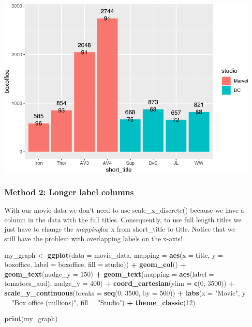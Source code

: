 \documentclass[
]{krantz}
\makeatletter
\newenvironment{Shaded}{\begin{snugshade}}{\end{snugshade}}
\newcommand{\DataTypeTok}[1]{\textcolor[rgb]{0.27,0.27,0.27}{#1}}
\newcommand{\DecValTok}[1]{\textcolor[rgb]{0.06,0.06,0.06}{#1}}
\newcommand{\KeywordTok}[1]{\textcolor[rgb]{0.27,0.27,0.27}{\textbf{#1}}}
\newcommand{\NormalTok}[1]{#1}
\newcommand{\OperatorTok}[1]{\textcolor[rgb]{0.43,0.43,0.43}{\textbf{#1}}}
\newcommand{\StringTok}[1]{\textcolor[rgb]{0.5,0.5,0.5}{#1}}
\newenvironment{kframe}{%
\medskip{}
\setlength{\fboxsep}{.8em}
 \def\at@end@of@kframe{}%
 \ifinner\ifhmode%
  \def\at@end@of@kframe{\end{minipage}}%
  \begin{minipage}{\columnwidth}%
 \fi\fi%
 \def\FrameCommand##1{\hskip\@totalleftmargin \hskip-\fboxsep
 \colorbox{shadecolor}{##1}\hskip-\fboxsep
     \hskip-\linewidth \hskip-\@totalleftmargin \hskip\columnwidth}%
 \MakeFramed {\advance\hsize-\width
   \@totalleftmargin\z@ \linewidth\hsize
   \@setminipage}}%
 {\par\unskip\endMakeFramed%
 \at@end@of@kframe}
\renewenvironment{Shaded}{\begin{kframe}}{\end{kframe}}
\makeatother
\begin{document}
\includegraphics[width=0.65\linewidth]{bookdown_files/figure-latex/unnamed-chunk-266-1}

\hypertarget{method-2-longer-label-columns}{%
\subsubsection{Method 2: Longer label columns}\label{method-2-longer-label-columns}}

With our movie data we don't need to use scale\_x\_discrete() because we have a column in the data with the full titles. Consequently, to use full length titles we just have to change the \emph{mapping}for x from short\_title to title. Notice that we still have the problem with overlapping labels on the x-axis!

\begin{Shaded}
\begin{Highlighting}[]
\NormalTok{my_graph <-}\StringTok{ }\KeywordTok{ggplot}\NormalTok{(}\DataTypeTok{data =}\NormalTok{ movie_data,}
           \DataTypeTok{mapping =} \KeywordTok{aes}\NormalTok{(}\DataTypeTok{x =}\NormalTok{ title,}
                         \DataTypeTok{y =}\NormalTok{ boxoffice,}
                         \DataTypeTok{label =}\NormalTok{ boxoffice, }
                         \DataTypeTok{fill =}\NormalTok{ studio)) }\OperatorTok{+}
\StringTok{  }\KeywordTok{geom_col}\NormalTok{() }\OperatorTok{+}
\StringTok{  }\KeywordTok{geom_text}\NormalTok{(}\DataTypeTok{nudge_y =} \DecValTok{150}\NormalTok{)  }\OperatorTok{+}
\StringTok{  }\KeywordTok{geom_text}\NormalTok{(}\DataTypeTok{mapping =} \KeywordTok{aes}\NormalTok{(}\DataTypeTok{label =}\NormalTok{ tomatoes_aud), }
            \DataTypeTok{nudge_y =} \DecValTok{400}\NormalTok{) }\OperatorTok{+}
\StringTok{  }\KeywordTok{coord_cartesian}\NormalTok{(}\DataTypeTok{ylim =} \KeywordTok{c}\NormalTok{(}\DecValTok{0}\NormalTok{, }\DecValTok{3500}\NormalTok{)) }\OperatorTok{+}
\StringTok{  }\KeywordTok{scale_y_continuous}\NormalTok{(}\DataTypeTok{breaks =} \KeywordTok{seq}\NormalTok{(}\DecValTok{0}\NormalTok{, }\DecValTok{3500}\NormalTok{, }\DataTypeTok{by =} \DecValTok{500}\NormalTok{)) }\OperatorTok{+}
\StringTok{  }\KeywordTok{labs}\NormalTok{(}\DataTypeTok{x =} \StringTok{"Movie"}\NormalTok{,}
       \DataTypeTok{y =} \StringTok{"Box office (millions)"}\NormalTok{,}
       \DataTypeTok{fill =} \StringTok{"Studio"}\NormalTok{) }\OperatorTok{+}
\StringTok{  }\KeywordTok{theme_classic}\NormalTok{(}\DecValTok{12}\NormalTok{)}
  

\KeywordTok{print}\NormalTok{(my_graph)}
\end{Highlighting}
\end{Shaded}
\end{document}
